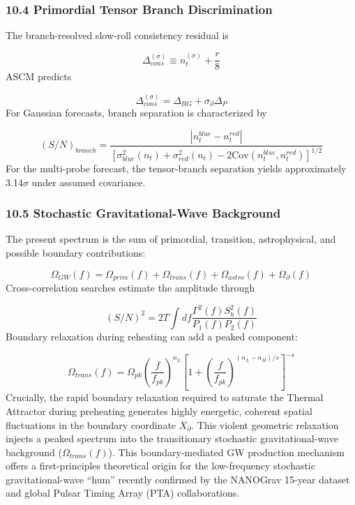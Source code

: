 \documentclass[aps,prd,onecolumn,superscriptaddress,nofootinbib,longbibliography,10pt]{revtex4-2}
\begin{document}
  
\subsubsection*{10.4 Primordial Tensor Branch Discrimination}

  The branch-resolved slow-roll consistency residual is


  \[ \Delta_{cons}^{(\sigma)} \equiv n_t^{(\sigma)} + \frac{r}{8} \]
  ASCM predicts


  \[ \Delta_{cons}^{(\sigma)} = \Delta_{RG} + \sigma_\partial \Delta_P \]
  For Gaussian forecasts, branch separation is characterized by


  \[ (S/N)_{branch} = \frac{|n_t^{blue} - n_t^{red}|}{\left[ \sigma_{blue}^2(n_t) + \sigma_{red}^2(n_t) - 2\text{Cov}(n_t^{blue}, n_t^{red}) \right]^{1/2}} \]
  For the multi-probe forecast, the tensor-branch separation yields approximately 3.14$\sigma$ under assumed covariance.



  
\subsubsection*{10.5 Stochastic Gravitational-Wave Background}

  The present spectrum is the sum of primordial, transition, astrophysical, and possible boundary contributions:


  \[ \Omega_{GW}(f) = \Omega_{prim}(f) + \Omega_{trans}(f) + \Omega_{astro}(f) + \Omega_\partial(f) \]
  Cross-correlation searches estimate the amplitude through


  \[ (S/N)^2 = 2T \int df \frac{\Gamma^2(f)S_h^2(f)}{P_1(f)P_2(f)} \]
  Boundary relaxation during reheating can add a peaked component:


  \[ \Omega_{trans}(f) = \Omega_{pk}\left(\frac{f}{f_{pk}}\right)^{n_L}\left[ 1 + \left(\frac{f}{f_{pk}}\right)^{(n_L - n_H)/s} \right]^{-s} \]
Crucially, the rapid boundary relaxation required to saturate the Thermal Attractor during preheating generates highly energetic, coherent spatial fluctuations in the boundary coordinate \(X_\partial\). This violent geometric relaxation injects a peaked spectrum into the transitionary stochastic gravitational-wave background (\(\Omega_{trans}(f)\)). This boundary-mediated GW production mechanism offers a first-principles theoretical origin for the low-frequency stochastic gravitational-wave ``hum'' recently confirmed by the NANOGrav 15-year dataset and global Pulsar Timing Array (PTA) collaborations.
\end{document}
